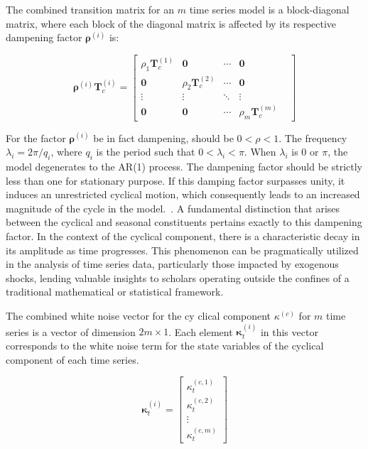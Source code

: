     The combined transition matrix for an $m$ time series model is a block-diagonal matrix,
    where each block of the diagonal matrix is affected by its respective dampening factor $\bm{\rho}^{(i)}$ is:

    \begin{equation}
        \bm{\rho}^{(i)} \bm{T}_c^{(i)} =
        \left[
            \begin{array}{ccccc}
                \rho_1 \bm{T}_c^{(1)} & \mathbf{0} & \cdots & \mathbf{0} \\
                \mathbf{0} & \rho_2 \bm{T}_c^{(2)} & \cdots & \mathbf{0} & \\
                \vdots & \vdots & \ddots & \vdots & \\
                \mathbf{0} & \mathbf{0} & \cdots & \rho_m \bm{T}_c^{(m)}
            \end{array}
        \right]
        \label{eq:cyclical_transition_mv}
    \end{equation}

    For the factor $\bm{\rho}^{(i)}$ be in fact dampening, should be $ 0 < \rho < 1$.
    The frequency $\lambda_i = 2\pi/q_i $, where $q_i$ is the period such that $0 < \lambda_i < \pi$.
    When $\lambda_i$ is 0 or $\pi$, the model degenerates to the AR(1) process.
    The dampening factor should be strictly less than one for stationary purpose.
    If this damping factor surpasses unity, it induces an unrestricted cyclical motion,
    which consequently leads to an increased magnitude of the cycle in the model.~\cite{qiu_multivariate_2018}.
    A fundamental distinction that arises between the cyclical and seasonal constituents pertains exactly to this dampening factor.
    In the context of the cyclical component, there is a characteristic decay in its amplitude as time progresses.
    This phenomenon can be pragmatically utilized in the analysis of time series data,
    particularly those impacted by exogenous shocks,
    lending valuable insights to scholars operating outside the confines of a traditional mathematical or statistical framework.


    The combined white noise vector for the cy clical component $\kappa^{(c)}$ for $m$ time series is a vector of dimension $2m \times 1$.
    Each element $\bm{\kappa}_{t}^{(i)}$ in this vector corresponds to the white noise term for the state variables of the cyclical component of each time series.

    \begin{equation}
        \bm{\kappa}_{t}^{(i)}=
            \left[
                \begin{array}{c}
                    \kappa_{t}^{(c,1)} \\
                    \kappa_{t}^{(c,2)} \\
                    \vdots \\
                    \kappa_{t}^{(c,m)}
                \end{array}
            \right]
        \label{eq:cyclical_error_mv}
    \end{equation}

